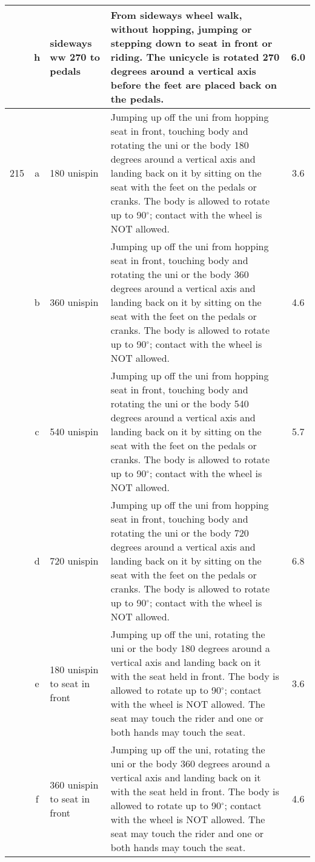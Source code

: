\begin{longtable}{|r|c|p{4cm}|p{8cm}|c|}
\hline
  & h & sideways ww 270 to pedals & From sideways wheel walk, without hopping, jumping or stepping down to seat in front or riding. The unicycle is rotated 270 degrees around a vertical axis before the feet are placed back on the pedals. & 6.0 \\ 
\hline
215 & a & 180 unispin & Jumping up off the uni from hopping seat in front, touching body and rotating the uni or the body 180 degrees around a vertical axis and landing back on it by sitting on the seat with the feet on the pedals or cranks. The body is allowed to rotate up to 90$^\circ$; contact with the wheel is NOT allowed. & 3.6 \\ 
\hline
  & b & 360 unispin & Jumping up off the uni from hopping seat in front, touching body and rotating the uni or the body 360 degrees around a vertical axis and landing back on it by sitting on the seat with the feet on the pedals or cranks. The body is allowed to rotate up to 90$^\circ$; contact with the wheel is NOT allowed. & 4.6 \\ 
\hline
  & c & 540 unispin & Jumping up off the uni from hopping seat in front, touching body and rotating the uni or the body 540 degrees around a vertical axis and landing back on it by sitting on the seat with the feet on the pedals or cranks. The body is allowed to rotate up to 90$^\circ$; contact with the wheel is NOT allowed. & 5.7 \\ 
\hline
  & d & 720 unispin & Jumping up off the uni from hopping seat in front, touching body and rotating the uni or the body 720 degrees around a vertical axis and landing back on it by sitting on the seat with the feet on the pedals or cranks. The body is allowed to rotate up to 90$^\circ$; contact with the wheel is NOT allowed. & 6.8 \\ 
\hline
  & e & 180 unispin to seat in front  & Jumping up off the uni, rotating the uni or the body 180 degrees around a vertical axis and landing back on it with the seat held in front. The body is allowed to rotate up to 90$^\circ$; contact with the wheel is NOT allowed. The seat may touch the rider and one or both hands may touch the seat.  & 3.6 \\ 
\hline
  & f & 360 unispin to seat in front  & Jumping up off the uni, rotating the uni or the body 360 degrees around a vertical axis and landing back on it with the seat held in front. The body is allowed to rotate up to 90$^\circ$; contact with the wheel is NOT allowed. The seat may touch the rider and one or both hands may touch the seat.  & 4.6 \\ 

\end{longtable}
